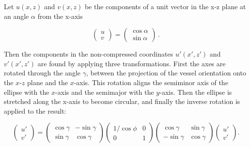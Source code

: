     Let $u(x,z)$ and $v(x,z)$ be the components of a unit vector in the x-z plane at an angle $\alpha$ from the x-axis
    
    \begin{equation}
      \left( \begin{array}{c}
        u \\
        v
      \end{array} \right)
       =
       \left( \begin{array}{c}
         \cos \alpha \\
         \sin \alpha
       \end{array} \right)\,.
    \end{equation}
    
    Then the components in the non-compressed coordinates $u'\left(x',z'\right)$ and $v'\left(x',z'\right)$ are found by applying three transformations. First the axes are rotated through the angle $\gamma$, between the projection of the vessel orientation onto the $x$-$z$ plane and the $x$-axis. This rotation aligns the semiminor axis of the ellipse with the $x$-axis and the semimajor with the $y$-axis. Then the ellipse is stretched along the x-axis to become circular, and finally the inverse rotation is applied to the result:
    
    \begin{equation}
      \left( \begin{array}{c}
        u' \\
        v'
      \end{array} \right)
      =
      \left( \begin{array}{cc}
        \cos \gamma & - \sin \gamma \\
        \sin \gamma &   \cos \gamma
      \end{array} \right)
      \left( \begin{array}{cc}
        1/\cos \phi & 0 \\
        0 & 1
      \end{array} \right)
      \left( \begin{array}{cc}
         \cos \gamma & \sin \gamma \\
        -\sin \gamma & \cos \gamma
      \end{array} \right)
      \left( \begin{array}{c}
        u' \\
        v'
      \end{array} \right) .
    \end{equation}
    
